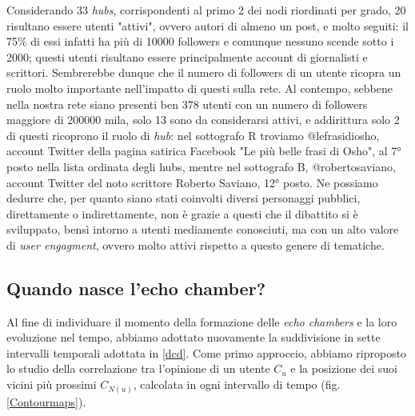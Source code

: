    Considerando 33 \textit{hubs}, corrispondenti al primo \SI{2}{\permille} dei nodi riordinati per grado, 20 risultano essere utenti "attivi", ovvero autori di almeno un post, e molto seguiti: il 75\% di essi infatti ha più di 10000 followers e comunque nessuno scende sotto i 2000; questi utenti risultano essere principalmente account di giornalisti e scrittori. Sembrerebbe dunque che il numero di followers di un utente ricopra un ruolo molto importante nell'impatto di questi sulla rete.
    Al contempo, sebbene nella nostra rete siano presenti ben 378 utenti con un numero di followers maggiore di 200000 mila, solo 13 sono da considerarsi attivi, e addirittura solo 2 di questi ricoprono il ruolo di \textit{hub}: nel sottografo R troviamo @lefrasidiosho, account Twitter della pagina satirica Facebook "Le più belle frasi di Osho", al 7° posto nella lista ordinata degli hubs, mentre nel sottografo B, @robertosaviano, account Twitter del noto scrittore Roberto Saviano, 12° posto. Ne possiamo dedurre che, per quanto siano stati coinvolti diversi personaggi pubblici, direttamente o indirettamente, non è grazie a questi che il dibattito si è sviluppato, bensì intorno a utenti mediamente conosciuti, ma con un alto valore di \textit{user engagment}, ovvero molto attivi rispetto a questo genere di tematiche.
    
    \subsection{Quando nasce l'echo chamber?}\label{when}
    Al fine di individuare il momento della formazione delle \textit{echo chambers} e la loro evoluzione nel tempo, abbiamo adottato nuovamente la suddivisione in sette intervalli temporali adottata in \ref{dcd}.
    Come primo approccio, abbiamo riproposto lo studio della correlazione tra l’opinione di un utente $C_{u}$ e la posizione dei suoi vicini più prossimi $C_{N (u)}$, calcolata in ogni intervallo di tempo (fig. \ref{Contourmaps}). 
    
